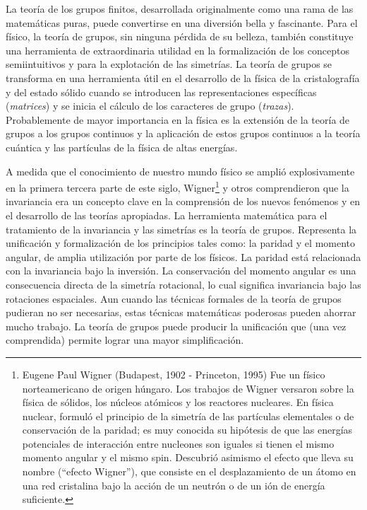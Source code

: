 La teoría de los grupos finitos, desarrollada originalmente como una rama de las matemáticas puras, puede convertirse en una diversión bella y fascinante. Para el físico, la teoría de grupos, sin ninguna pérdida de su belleza, también constituye una herramienta de extraordinaria utilidad en la formalización de los conceptos semiintuitivos y para la explotación de las simetrías. La teoría de grupos se transforma en una herramienta útil en el desarrollo de la física de la cristalografía y del estado sólido cuando se introducen las representaciones específicas (\emph{matrices}) y se inicia el cálculo de los caracteres de grupo (\emph{trazas}). Probablemente de mayor importancia en la física es la extensión de la teoría de grupos a los grupos continuos y la aplicación de estos grupos continuos a la teoría cuántica y las partículas de la física de altas energías.
\par
A medida que el conocimiento de nuestro mundo físico se amplió explosivamente en la primera tercera parte de este siglo, Wigner\footnote{Eugene Paul Wigner (Budapest, 1902 - Princeton, 1995) Fue un físico norteamericano de origen húngaro. Los trabajos de Wigner versaron sobre la física de sólidos, los núcleos atómicos y los reactores nucleares. En física nuclear, formuló el principio de la simetría de las partículas elementales o de conservación de la paridad; es muy conocida su hipótesis de que las energías potenciales de interacción entre nucleones son iguales si tienen el mismo momento angular y el mismo spin. Descubrió asimismo el efecto que lleva su nombre (\enquote{efecto Wigner}), que consiste en el desplazamiento de un átomo en una red cristalina bajo la acción de un neutrón o de un ión de energía suficiente.} y otros comprendieron que la invariancia era un concepto clave en la comprensión de los nuevos fenómenos y en el desarrollo de las teorías apropiadas. La herramienta matemática para el tratamiento de la invariancia y las simetrías es la teoría de grupos. Representa la unificación y formalización de los principios tales como: la paridad y el momento angular, de amplia utilización por parte de los físicos. La paridad está relacionada con la invariancia bajo la inversión. La conservación del momento angular es una consecuencia directa de la simetría rotacional, lo cual significa invariancia bajo las rotaciones espaciales. Aun cuando las técnicas formales de la teoría de grupos pudieran no ser necesarias, estas técnicas matemáticas poderosas pueden ahorrar mucho trabajo. La teoría de grupos puede producir la unificación que (una vez comprendida) permite lograr una mayor simplificación.

